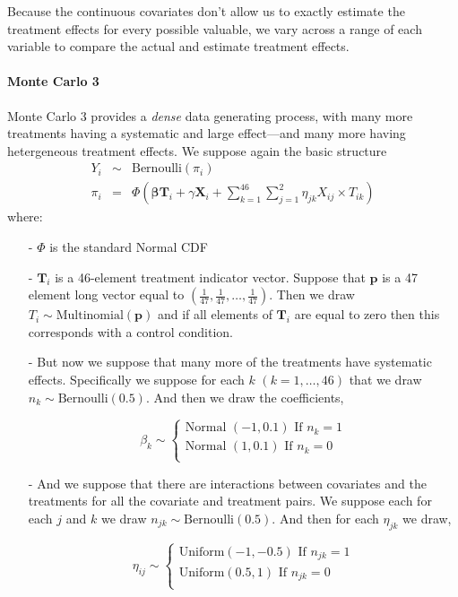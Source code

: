 \documentclass[12pt,letterpaper]{article}
\numberwithin{equation}{section}
\numberwithin{equation}{section}
\begin{document}
Because the continuous covariates don't allow us to exactly estimate the treatment effects for every possible valuable, we vary across a range of each variable to compare the actual and estimate treatment effects.

\paragraph{Monte Carlo 3} Monte Carlo 3 provides a \emph{dense} data generating process, with many more treatments having a systematic and large effect---and many more having hetergeneous treatment effects.  We suppose again the basic structure 
\begin{eqnarray}
Y_{i} & \sim & \text{Bernoulli} (\pi_{i} ) \nonumber \\
\pi_{i} & = & \Phi\left(\boldsymbol{\beta} \boldsymbol{T}_{i}  + \gamma \boldsymbol{X}_{i} + \sum_{k=1}^{46}\sum_{j=1}^{2}\eta_{jk} X_{ij}\times T_{ik} \right)
\label{e:generation}
\end{eqnarray}
where:
\begin{itemize}
\item[-] $\Phi$ is the standard Normal CDF
\item[-] $\boldsymbol{T}_{i}$ is a 46-element treatment indicator vector.  Suppose that $\boldsymbol{p}$ is a 47 element long vector  equal to $(\frac{1}{47}, \frac{1}{47}, \hdots, \frac{1}{47})$.  Then we draw $T_{i} \sim \text{Multinomial}(\boldsymbol{p})$ and if all elements of $\boldsymbol{T}_{i}$ are equal to zero then this corresponds with a control condition.  
\item[-] But now we suppose that many more of the treatments have systematic effects.  Specifically we suppose for each $k$ $(k = 1, \hdots, 46)$ that we draw $n_{k} \sim \text{Bernoulli}(0.5)$.  And then we draw the coefficients, 

\begin{equation}
\beta_{k}   \sim    \begin{cases}  \text{Normal }(-1, 0.1) \text{  If } n_{k} = 1  \\ 
													    \text{Normal }(1, 0.1) \text{  If } n_{k} = 0  \\
\end{cases} \nonumber 
\end{equation}

\item[-] And we suppose that there are interactions between covariates and the treatments for all the covariate and treatment pairs.  We suppose each for each $j$ and $k$ we draw $n_{jk} \sim \text{Bernoulli}(0.5)$.  And then for each $\eta_{jk}$ we draw, 

\begin{equation} 
\eta_{ij}  \sim  \begin{cases} \text{Uniform}(-1, -0.5) \text{ If } n_{jk} = 1 \\
													  \text{Uniform}(0.5, 1) \text{ If } n_{jk}  =  0 \\
\end{cases}			\nonumber 										  
\end{equation}													  

\end{itemize}
\end{document}
